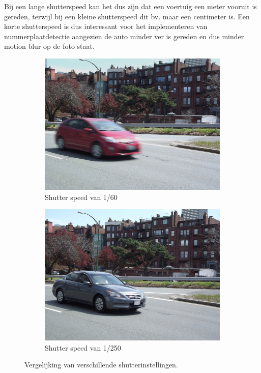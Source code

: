 Bij een lange shutterspeed kan het dus zijn dat een voertuig een meter vooruit is gereden, terwijl bij een kleine shutterspeed dit bv. maar een centimeter is. Een korte shutterspeed is dus interessant voor het implementeren van nummerplaatdetectie aangezien de auto minder ver is gereden en dus minder motion blur op de foto staat.
%
\begin{figure}[h!]
	\centering
	\begin{subfigure}[b]{0.4\linewidth}
		\includegraphics[width=\linewidth]{img/shutter-slow.jpg}
		\caption{Shutter speed van 1/60}
	\end{subfigure}
	\begin{subfigure}[b]{0.4\linewidth}
		\includegraphics[width=\linewidth]{img/shutter-fast.jpg}
		\caption{Shutter speed van 1/250}
	\end{subfigure}
	\label{fig:ntlpc}
	\caption{Vergelijking van verschillende shutterinstellingen. \autocite{easy2019shutter}}
\end{figure}

